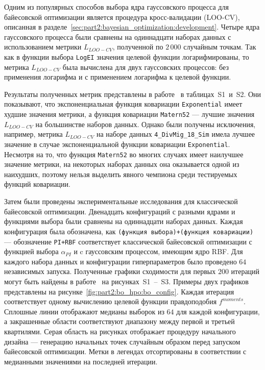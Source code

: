 Одним из популярных способов выбора ядра гауссовского процесса для байесовской оптимизации является процедура кросс-валидации (LOO-CV), описанная в разделе~\ref{sec:part2:bayesian_optimization:development}.%
Четыре ядра гауссовского процесса были сравнены на одиннадцати наборах данных с использованием метрики $L_{LOO-CV}$, полученной по $2{\,}000$ случайным точкам.
Так как в функции выбора \texttt{LogEI} значения целевой функции логарифмированы, то метрика $L_{LOO-CV}$ была вычислена для двух гауссовских процессов: без применения логарифма и с применением логарифма к целевой функции.

Результаты полученных метрик представлены в работе~\cite{noskova2023bayesian}  в таблицах~S1~и~S2.
Они показывают, что экспоненциальная функция ковариации \texttt{Exponential} имеет худшие значения метрики, а функция ковариации \texttt{Matern52} --- лучшие значения $L_{LOO-CV}$ на большинстве наборов данных.
Однако были получены исключения, например, метрика $L_{LOO-CV}$ на наборе данных \texttt{4\_DivMig\_18\_Sim} имела лучшее значение в случае экспоненциальной функции ковариации \texttt{Exponential}.
Несмотря на то, что функция \texttt{Matern52} во многих случаях имеет наилучшее значение метрики, на некоторых наборах данных она оказывается одной из наихудших, поэтому нельзя выделить явного чемпиона среди тестируемых функций ковариации.

Затем были проведены экспериментальные исследования для классической байесовской оптимизации.
Двенадцать конфигураций с разными ядрами и функциями выбора были сравнены на одиннадцати наборах данных.
Каждая конфигурация была обозначена, как \texttt{(функция выбора)+(функция ковариации)} --- обозначение \texttt{PI+RBF} соответствует классической байесовской оптимизации с функцией выбора $\alpha_{PI}$ и c гауссовским процессом, имеющим ядро RBF.
Для каждого набора данных и конфигурации гиперпараметров было проведено $64$ независимых запуска.
Полученные графики сходимости для первых $200$ итераций могут быть найдены в работе~\cite{noskova2023bayesian} на рисунках~S1~--~S3.
Примеры двух графиков представлены на рисунке~\ref{fig:part2:bo_hpo:bo_config}.
Каждая итерация соответствует одному вычислению целевой функции правдоподобия $f^{moments}$.
Сплошные линии отображают медианы выборок из $64$ для каждой конфигурации, а закрашенные области соответствуют диапазону между первой и третьей квартилями.
Серая область на рисунках отображает процедуру начального дизайна --- генерацию начальных точек случайным образом перед запуском байесовской оптимизации.
Метки в легендах отсортированы в соответствии с медианными значениями на последней итерации.

